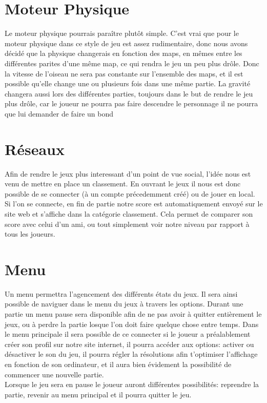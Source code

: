 \documentclass [11pt]{report}
\begin{document}
\newpage

	\section {Moteur Physique}
	Le moteur physique pourrais para\^itre plut\^ot simple. C'est vrai que pour le moteur physique dans ce style de jeu est assez rudimentaire, donc nous avons décidé que la physique changerais en fonction des maps, en mêmes entre les différentes parites d'une même map, ce qui rendra le jeu un peu plus drôle. Donc la vitesse de l'oiseau ne sera pas constante sur l'ensemble des maps, et il est possible qu'elle change une ou plusieurs fois dans une même partie. La gravité changera aussi lors des différentes parties, toujours dans le but de rendre le jeu plus drôle, car le joueur ne pourra pas faire descendre le personnage il ne pourra que lui demander de faire un bond


	\section {Réseaux}
	Afin de rendre le jeux plus interessant d'un point de vue social, l'idée nous est venu de mettre en place un classement. En ouvrant le jeux il nous est donc possible de se connecter (à un compte précedemment créé) ou de jouer en local. Si l'on se connecte, en fin de partie notre score est automatiquement envoyé sur le site web et s'affiche dans la catégorie classement. Cela permet de comparer son score avec celui d'un ami, ou tout simplement voir notre niveau par rapport à tous les joueurs.\\\vspace{5mm}


	\section {Menu}
	Un menu permettra l'agencement des différents états du jeux. Il sera ainsi possible de naviguer dans le menu du jeux à travers les options. Durant une partie un menu pause sera disponible afin de ne pas avoir à quitter entièrement le jeux, ou à perdre la partie losque l'on doit faire quelque chose entre temps. Dans le menu principale il sera possible de ce connecter si le joueur a préalablement créer son profil sur notre site internet, il pourra accéder aux options: activer ou désactiver le son du jeu, il pourra régler la résolutions afin t'optimiser l'affichage en fonction de son ordinateur, et il aura bien évidement la possibilité de commencer une nouvelle partie. \\
Lorsque le jeu sera en pause le joueur auront différentes possibilités: reprendre la partie, revenir au menu principal et il pourra quitter le jeu.\\\vspace{5mm}
\end{document}

